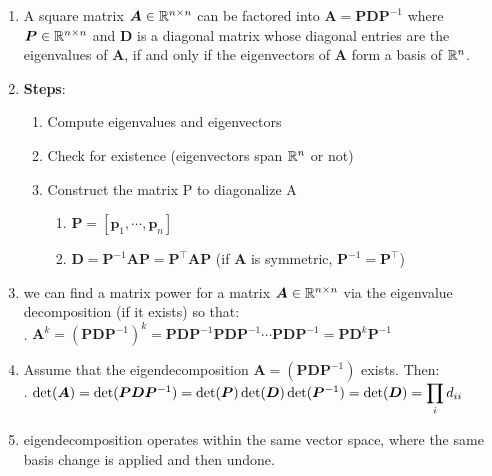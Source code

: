 \begin{enumerate}
    \item 
    \begin{theorem}[Eigendecomposition]
        A square matrix $\bm{A} \in \mathbb{R}^{n\times n}$ can be factored into $\bm{A} = \bm{PDP}^{-1}$ where $\bm{P} \in \mathbb{R}^{n\times n}$ and $\bm{D}$ is a diagonal matrix whose diagonal entries are the eigenvalues of $\bm{A}$, if and only if the eigenvectors of $\bm{A}$ form a basis of $\mathbb{R}^n$.
        \hfill \cite{mfml/book/mml/Deisenroth-Faisal-Ong}
    \end{theorem}

    \item \textbf{Steps}:
    \begin{enumerate}
        \item Compute eigenvalues and eigenvectors

        \item Check for existence (eigenvectors span $\mathbb{R}^n$ or not)

        \item Construct the matrix P to diagonalize A
        \begin{enumerate}
            \item $\bm{P} = [\bm{p}_1, \cdots, \bm{p}_n]$

            \item $\bm{D} = \bm{P}^{-1}\bm{AP} = \bm{P}^{\top}\bm{AP}$
            \hfill (if $\bm{A}$ is symmetric, $\bm{P}^{-1} = \bm{P}^{\top}$)
        \end{enumerate}
    \end{enumerate}

    \item we can find a matrix power for a matrix $\bm{A} \in \mathbb{R}^{n\times n}$ via the eigenvalue decomposition (if it exists) so that:
    \hfill \cite{mfml/book/mml/Deisenroth-Faisal-Ong}
    \\
    .\hfill
    $
        \bm{A}^k 
        = (\bm{PDP}^{-1})^k 
        = \bm{PDP}^{-1}\bm{PDP}^{-1}\cdots \bm{PDP}^{-1} 
        = \bm{PD}^k \bm{P}^{-1}
    $
    \hfill \cite{mfml/book/mml/Deisenroth-Faisal-Ong}

    \item Assume that the eigendecomposition $\bm{A} = (\bm{PDP}^{-1})$ exists. Then: 
    \hfill \cite{mfml/book/mml/Deisenroth-Faisal-Ong}
    \\
    .\hfill
    $
        \det(\bm{A}) 
        = \det(\bm{PDP}^{ -1}) 
        = \det(\bm{P}) \det(\bm{D}) \det(\bm{P}^{-1})
        = \det(\bm{D})
        = \displaystyle\prod_{i} d_{ii}
    $
    \hfill \cite{mfml/book/mml/Deisenroth-Faisal-Ong}

    \item eigendecomposition operates within the same vector space, where the same basis change is applied and then undone. 
    \hfill \cite{mfml/book/mml/Deisenroth-Faisal-Ong}
\end{enumerate}



